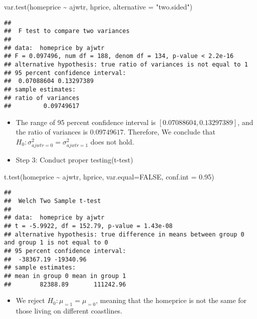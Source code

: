 \documentclass[
  12pt,
]{article}
\newenvironment{Shaded}{\begin{snugshade}}{\end{snugshade}}
\newcommand{\AttributeTok}[1]{\textcolor[rgb]{0.77,0.63,0.00}{#1}}
\newcommand{\ConstantTok}[1]{\textcolor[rgb]{0.00,0.00,0.00}{#1}}
\newcommand{\FloatTok}[1]{\textcolor[rgb]{0.00,0.00,0.81}{#1}}
\newcommand{\FunctionTok}[1]{\textcolor[rgb]{0.00,0.00,0.00}{#1}}
\newcommand{\NormalTok}[1]{#1}
\newcommand{\SpecialCharTok}[1]{\textcolor[rgb]{0.00,0.00,0.00}{#1}}
\newcommand{\StringTok}[1]{\textcolor[rgb]{0.31,0.60,0.02}{#1}}
\providecommand{\tightlist}{%
  \setlength{\itemsep}{0pt}\setlength{\parskip}{0pt}}
\begin{document}
\begin{Shaded}
\begin{Highlighting}[]
\FunctionTok{var.test}\NormalTok{(homeprice }\SpecialCharTok{\textasciitilde{}}\NormalTok{ ajwtr, hprice, }\AttributeTok{alternative =} \StringTok{"two.sided"}\NormalTok{)}
\end{Highlighting}
\end{Shaded}

\begin{verbatim}
## 
##  F test to compare two variances
## 
## data:  homeprice by ajwtr
## F = 0.097496, num df = 188, denom df = 134, p-value < 2.2e-16
## alternative hypothesis: true ratio of variances is not equal to 1
## 95 percent confidence interval:
##  0.07088604 0.13297389
## sample estimates:
## ratio of variances 
##         0.09749617
\end{verbatim}

\begin{itemize}
\item
  The range of 95 percent confidence interval is
  \([0.07088604,0.13297389]\), and the ratio of variances is
  \(0.09749617\). Therefore, We conclude that
  \(H_0:\sigma^2_{ajwtr=0}=\sigma^2_{ajwtr=1}\) does not hold.
\item
  Step 3: Conduct proper testing(t-test)\\
\end{itemize}

\begin{Shaded}
\begin{Highlighting}[]
\FunctionTok{t.test}\NormalTok{(homeprice }\SpecialCharTok{\textasciitilde{}}\NormalTok{ ajwtr, hprice, }\AttributeTok{var.equal=}\ConstantTok{FALSE}\NormalTok{, }\AttributeTok{conf.int =} \FloatTok{0.95}\NormalTok{)}
\end{Highlighting}
\end{Shaded}

\begin{verbatim}
## 
##  Welch Two Sample t-test
## 
## data:  homeprice by ajwtr
## t = -5.9922, df = 152.79, p-value = 1.43e-08
## alternative hypothesis: true difference in means between group 0 and group 1 is not equal to 0
## 95 percent confidence interval:
##  -38367.19 -19340.96
## sample estimates:
## mean in group 0 mean in group 1 
##        82388.89       111242.96
\end{verbatim}

\begin{itemize}
\tightlist
\item
  We reject \(H_0: \mu_{=1}=\mu_{=0}\), meaning that the homeprice is
  not the same for those living on different coastlines.
\end{itemize}
\end{document}
